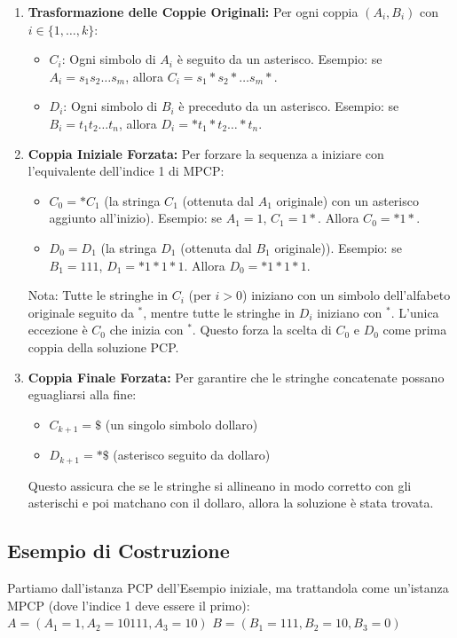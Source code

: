 \documentclass[a4paper]{article}
\theoremstyle{definition} %
\theoremstyle{remark} %
\begin{document}
\begin{enumerate}
    \item \textbf{Trasformazione delle Coppie Originali:}
    Per ogni coppia $(A_i, B_i)$ con $i \in \{1, \dots, k\}$:
    \begin{itemize}
        \item $C_i$: Ogni simbolo di $A_i$ è seguito da un asterisco.
              Esempio: se $A_i = s_1 s_2 \dots s_m$, allora $C_i = s_1 * s_2 * \dots s_m *$.
        \item $D_i$: Ogni simbolo di $B_i$ è preceduto da un asterisco.
              Esempio: se $B_i = t_1 t_2 \dots t_n$, allora $D_i = * t_1 * t_2 \dots * t_n$.
    \end{itemize}

    \item \textbf{Coppia Iniziale Forzata:}
    Per forzare la sequenza a iniziare con l'equivalente dell'indice 1 di MPCP:
    \begin{itemize}
        \item $C_0 = * C_1$ (la stringa $C_1$ (ottenuta dal $A_1$ originale) con un asterisco aggiunto all'inizio).
              Esempio: se $A_1 = 1$, $C_1 = 1*$. Allora $C_0 = *1*$.
        \item $D_0 = D_1$ (la stringa $D_1$ (ottenuta dal $B_1$ originale)).
              Esempio: se $B_1 = 111$, $D_1 = *1*1*1$. Allora $D_0 = *1*1*1$.
    \end{itemize}
    Nota: Tutte le stringhe in $C_i$ (per $i>0$) iniziano con un simbolo dell'alfabeto originale seguito da $^*$, mentre tutte le stringhe in $D_i$ iniziano con $^*$. L'unica eccezione è $C_0$ che inizia con $^*$. Questo forza la scelta di $C_0$ e $D_0$ come prima coppia della soluzione PCP.

    \item \textbf{Coppia Finale Forzata:}
    Per garantire che le stringhe concatenate possano eguagliarsi alla fine:
    \begin{itemize}
        \item $C_{k+1} = \$$ (un singolo simbolo dollaro)
        \item $D_{k+1} = *\$$ (asterisco seguito da dollaro)
    \end{itemize}
    Questo assicura che se le stringhe si allineano in modo corretto con gli asterischi e poi matchano con il dollaro, allora la soluzione è stata trovata.
\end{enumerate}

\subsection{Esempio di Costruzione}
Partiamo dall'istanza PCP dell'Esempio iniziale, ma trattandola come un'istanza MPCP (dove l'indice 1 deve essere il primo):
$A = (A_1 = 1, A_2 = 10111, A_3 = 10)$
$B = (B_1 = 111, B_2 = 10, B_3 = 0)$
\end{document}
